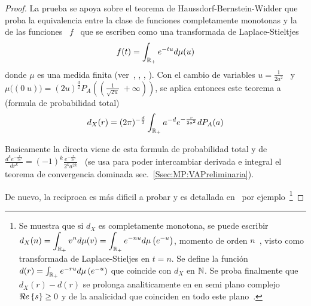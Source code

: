 \begin{proof}
  La prueba se apoya sobre el teorema de Haussdorf-Bernstein-Widder que proba la
  equivalencia entre la  clase de funciones completamente monotonas  y la de las
  funciones \ $f$ \ que se escriben como una transformada de Laplace-Stieltjes
  \[
  f(t) = \int_{\mathbb{R}_+} e^{-t u} d\mu(u)
  \]
  donde  $\mu$  es  una  medida finita  (ver~\cite[Teo.~3]{Sch38},  \cite{Ber29,
    Haus21:I, Haus21:II,  Wid32}, \cite[\S~12]{Wid46}, \cite[\S~XIII.4]{Fel71}).
  Con el  cambio de variables  $u = \frac{1}{2  a^2}$ \ y  \ $\mu\big( (0  \; u)
  \big) =  (2 u)^{\frac{d}{2}} P_A\left( \left( \frac{1}{\sqrt{2  u}} \; +\infty
    \right) \right)$,  se aplica entonces este teorema  a (formula de probabilidad
  total)
  \[
  d_X(r)  =  (2 \pi)^{-\frac{d}{2}} \int_{\mathbb{R}_+} a^{-d} e^{-\frac{r}{2 a^2}} dP_A(a) 
  \]

  Basicamente la  directa viene  de esta  formula de probabilidad  total y  de \
  $\displaystyle     \frac{d^k    e^{-\frac{r}{2    a^2}}}{dr^k}     =    (-1)^k
  \frac{e^{-\frac{r}{2 a^2}}}{2^k  a^{2 k}}$ \  (se usa para  poder intercambiar
  derivada    e     integral    el    teorema     de    convergencia    dominada
  sec.~\ref{Ssec:MP:VAPreliminaria}).

  De  nuevo,   la  reciproca   es  m\'as  dificil   a  probar  y   es  detallada
  en~\cite[\S~12]{Wid46}  por  ejemplo~\footnote{Se  muestra  que  si  $d_X$  es
    completamente  monotona,  se  puede   escribir  \  $\displaystyle  d_X(n)  =
    \int_{\mathbb{R}_+}  v^n  d\mu(v) =  \int_{\mathbb{R}_+}  e^{-n  u} d\mu\left(  e^{-u}
    \right)$,  momento   de  orden  $n$~\cite{Hau21:I,   Hau21:II},  visto  como
    transformada de Laplace-Stieljes en $t =  n$. Se define la funci\'on $d(r) =
    \int_{\mathbb{R}_+} e^{- r  u} d\mu\left( e^{-u} \right)$ que  coincide con $d_X$
    en $\mathbb{N}$. Se proba finalmente que $d_X(r)-d(r)$ se prolonga analiticamente
    en en semi plano complejo $\Re e \left\{ s \right\}  \ge 0$ y de la analicidad que coinciden
    en todo este plano~\cite{Car21, CarKro05}.}
\end{proof}

